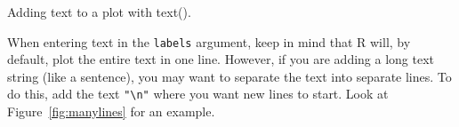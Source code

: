 \documentclass{tufte-book}\usepackage[]{graphicx}\usepackage[]{color}
\makeatletter
\def\maxwidth{ %
  \ifdim\Gin@nat@width>\linewidth
    \linewidth
  \else
    \Gin@nat@width
  \fi
}
\newcommand{\hlnum}[1]{\textcolor[rgb]{0.686,0.059,0.569}{#1}}%
\newcommand{\hlcom}[1]{\textcolor[rgb]{0.678,0.584,0.686}{\textit{#1}}}%
\newcommand{\hlstd}[1]{\textcolor[rgb]{0.345,0.345,0.345}{#1}}%
\newcommand{\hlkwc}[1]{\textcolor[rgb]{0.333,0.667,0.333}{#1}}%
\newcommand{\hlkwd}[1]{\textcolor[rgb]{0.737,0.353,0.396}{\textbf{#1}}}%
\newenvironment{kframe}{%
 \def\at@end@of@kframe{}%
 \ifinner\ifhmode%
  \def\at@end@of@kframe{\end{minipage}}%
  \begin{minipage}{\columnwidth}%
 \fi\fi%
 \def\FrameCommand##1{\hskip\@totalleftmargin \hskip-\fboxsep
 \colorbox{shadecolor}{##1}\hskip-\fboxsep
     \hskip-\linewidth \hskip-\@totalleftmargin \hskip\columnwidth}%
 \MakeFramed {\advance\hsize-\width
   \@totalleftmargin\z@ \linewidth\hsize
   \@setminipage}}%
 {\par\unskip\endMakeFramed%
 \at@end@of@kframe}
\newenvironment{knitrout}{}{} %
\makeatother
\begin{document}
\begin{footnotesize}
\begin{marginfigure}
\caption{Adding text to a plot with text().}
\label{fig:textexample}
\end{marginfigure}

When entering text in the \texttt{labels} argument, keep in mind that R will, by default, plot the entire text in one line. However, if you are adding a long text string (like a sentence), you may want to separate the text into separate lines. To do this, add the text \texttt{"\textbackslash n"} where you want new lines to start. Look at Figure~\ref{fig:manylines} for an example.


\end{footnotesize}
\end{document}

